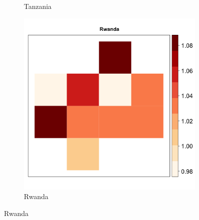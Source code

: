 \documentclass[11pt, oneside]{article}   	%
\begin{document}
\begin{figure}[t]
\begin{subfigure}[c]{0.32\textwidth}
\caption{Tanzania}
\label{fig:Tanzania_zeta}
\end{subfigure}
\begin{subfigure}[c]{0.32\textwidth}
\includegraphics[width=\textwidth]{../../Analysis/output/zeta_heatmaps/Rwanda_zeta.png}
\caption{Rwanda}
\label{fig:Rwanda_zeta}
\end{subfigure}


\end{figure}
\end{document}
